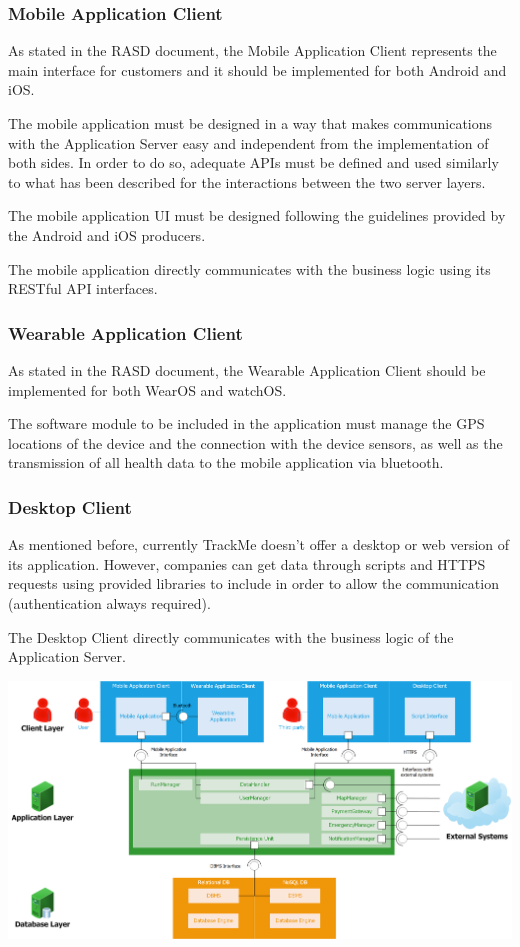 \subsubsection{Mobile Application Client}
As stated in the RASD document, the Mobile Application Client represents the main interface for customers and it should be implemented for both Android and iOS.

The mobile application must be designed in a way that makes communications with the Application Server easy and independent from the implementation of both sides. In order to do so, adequate APIs must be defined and used similarly to what has been described for the interactions between the two server layers.

The mobile application UI must be designed following the guidelines provided by the Android and iOS producers.

The mobile application directly communicates with the business logic using its RESTful API interfaces.

\subsubsection{Wearable Application Client}
As stated in the RASD document, the Wearable Application Client should be implemented for both WearOS and watchOS.

The software module to be included in the application must manage the GPS locations of the device and the connection with the device sensors, as well as the transmission of all health data to the mobile application via bluetooth.

\subsubsection{Desktop Client}
As mentioned before, currently TrackMe doesn't offer a desktop or web version of its application. However, companies can get data through scripts and HTTPS requests using provided libraries to include in order to allow the communication (authentication always required).

The Desktop Client directly communicates with the business logic of the Application Server.

\begin{center}
\includegraphics[scale=0.43]{sections/diagrams/globalCV.png}
\newline
{}
\end{center}

